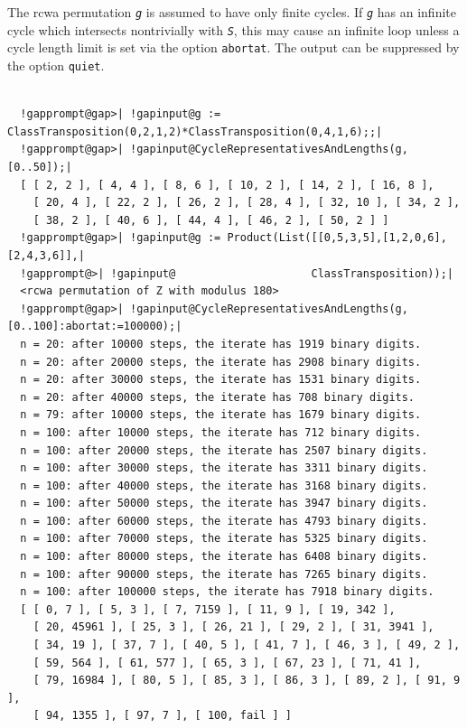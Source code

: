 \documentclass[a4paper,11pt]{report}
\begin{document}
{{{ The rcwa permutation \mbox{\texttt{\mdseries\slshape g}} is assumed to have only finite cycles. If \mbox{\texttt{\mdseries\slshape g}} has an infinite cycle which intersects non\texttt{}trivially with \mbox{\texttt{\mdseries\slshape S}}, this may cause an infinite loop unless a cycle length limit is set via the
option \texttt{abortat}. The output can be suppressed by the option \texttt{quiet}. 
\begin{Verbatim}[commandchars=!@|,fontsize=\small,frame=single,label=Example]
  
  !gapprompt@gap>| !gapinput@g := ClassTransposition(0,2,1,2)*ClassTransposition(0,4,1,6);;|
  !gapprompt@gap>| !gapinput@CycleRepresentativesAndLengths(g,[0..50]);|
  [ [ 2, 2 ], [ 4, 4 ], [ 8, 6 ], [ 10, 2 ], [ 14, 2 ], [ 16, 8 ], 
    [ 20, 4 ], [ 22, 2 ], [ 26, 2 ], [ 28, 4 ], [ 32, 10 ], [ 34, 2 ], 
    [ 38, 2 ], [ 40, 6 ], [ 44, 4 ], [ 46, 2 ], [ 50, 2 ] ]
  !gapprompt@gap>| !gapinput@g := Product(List([[0,5,3,5],[1,2,0,6],[2,4,3,6]],|
  !gapprompt@>| !gapinput@                     ClassTransposition));|
  <rcwa permutation of Z with modulus 180>
  !gapprompt@gap>| !gapinput@CycleRepresentativesAndLengths(g,[0..100]:abortat:=100000);|
  n = 20: after 10000 steps, the iterate has 1919 binary digits.
  n = 20: after 20000 steps, the iterate has 2908 binary digits.
  n = 20: after 30000 steps, the iterate has 1531 binary digits.
  n = 20: after 40000 steps, the iterate has 708 binary digits.
  n = 79: after 10000 steps, the iterate has 1679 binary digits.
  n = 100: after 10000 steps, the iterate has 712 binary digits.
  n = 100: after 20000 steps, the iterate has 2507 binary digits.
  n = 100: after 30000 steps, the iterate has 3311 binary digits.
  n = 100: after 40000 steps, the iterate has 3168 binary digits.
  n = 100: after 50000 steps, the iterate has 3947 binary digits.
  n = 100: after 60000 steps, the iterate has 4793 binary digits.
  n = 100: after 70000 steps, the iterate has 5325 binary digits.
  n = 100: after 80000 steps, the iterate has 6408 binary digits.
  n = 100: after 90000 steps, the iterate has 7265 binary digits.
  n = 100: after 100000 steps, the iterate has 7918 binary digits.
  [ [ 0, 7 ], [ 5, 3 ], [ 7, 7159 ], [ 11, 9 ], [ 19, 342 ],
    [ 20, 45961 ], [ 25, 3 ], [ 26, 21 ], [ 29, 2 ], [ 31, 3941 ],
    [ 34, 19 ], [ 37, 7 ], [ 40, 5 ], [ 41, 7 ], [ 46, 3 ], [ 49, 2 ],
    [ 59, 564 ], [ 61, 577 ], [ 65, 3 ], [ 67, 23 ], [ 71, 41 ],
    [ 79, 16984 ], [ 80, 5 ], [ 85, 3 ], [ 86, 3 ], [ 89, 2 ], [ 91, 9 ],
    [ 94, 1355 ], [ 97, 7 ], [ 100, fail ] ]
  

\end{Verbatim}}}}
\end{document}
